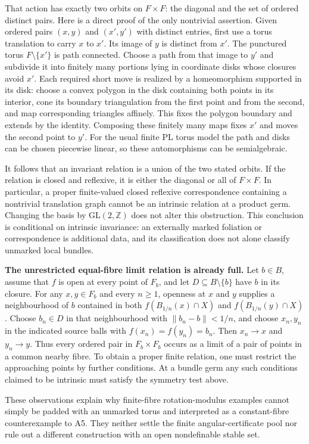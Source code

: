 That action has exactly two orbits on $F\times F$: the diagonal and the
set of ordered distinct pairs. Here is a direct proof of the only
nontrivial assertion. Given ordered pairs $(x,y)$ and $(x',y')$ with
distinct entries, first use a torus translation to carry $x$ to $x'$.
Its image of $y$ is distinct from $x'$. The punctured torus
$F\setminus\{x'\}$ is path connected. Choose a path from that image to
$y'$ and subdivide it into finitely many portions lying in coordinate
disks whose closures avoid $x'$. Each required short move is realized by
a homeomorphism supported in its disk: choose a convex polygon in the
disk containing both points in its interior, cone its boundary triangulation from the
first point and from the second, and map corresponding triangles
affinely. This fixes the polygon boundary and extends by the identity.
Composing these finitely many maps fixes $x'$ and moves the second point
to $y'$. For the usual finite PL torus model the path and disks can be
chosen piecewise linear, so these automorphisms can be semialgebraic.

It follows that an invariant relation is a union of the two stated
orbits. If the relation is closed and reflexive, it is either the
diagonal or all of $F\times F$. In particular, a proper finite-valued
closed reflexive correspondence containing a nontrivial translation
graph cannot be an intrinsic relation at a product germ. Changing the
basis by $\mathrm{GL}(2,\mathbb Z)$ does not alter this obstruction.
This conclusion is conditional on intrinsic invariance: an externally
marked foliation or correspondence is additional data, and its
classification does not alone classify unmarked local bundles.

\textbf{The unrestricted equal-fibre limit relation is already full.}
Let $b\in B$, assume that $f$ is open at every point of $F_b$, and let
$D\subseteq B\setminus\{b\}$ have $b$ in its closure. For any
$x,y\in F_b$ and every $n\ge1$, openness at $x$ and $y$ supplies a
neighbourhood of $b$ contained in both
$f(B_{1/n}(x)\cap X)$ and $f(B_{1/n}(y)\cap X)$. Choose
$b_n\in D$ in that neighbourhood with $\|b_n-b\|<1/n$, and choose
$x_n,y_n$ in the indicated source balls with
$f(x_n)=f(y_n)=b_n$. Then $x_n\to x$ and $y_n\to y$.
Thus every ordered pair in $F_b\times F_b$ occurs as a limit of a pair
of points in a common nearby fibre. To obtain a proper finite relation,
one must restrict the approaching points by further conditions. At a
bundle germ any such conditions claimed to be intrinsic must satisfy
the symmetry test above.

These observations explain why finite-fibre rotation-modulus examples
cannot simply be padded with an unmarked torus and interpreted as a
constant-fibre counterexample to A5. They neither settle the finite
angular-certificate pool nor rule out a different construction with an
open nondefinable stable set.
